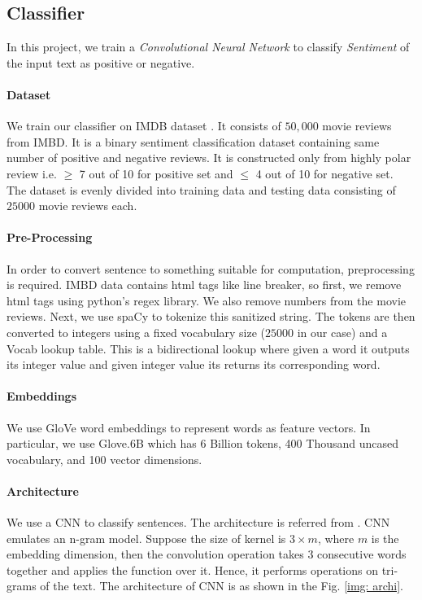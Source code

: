 \documentclass[12pt]{report}
\begin{document}
\begin{spacing}{1.5}
\section{Classifier}
In this project, we train a \textit{Convolutional Neural Network} to classify \textit{Sentiment} of the input text as positive or negative.
 \paragraph{Dataset}
We train our classifier on IMDB dataset \cite{imdb}. It consists of $50,000$ movie reviews from IMBD. It is a binary sentiment classification dataset containing same number of positive and negative reviews. It is constructed only from highly polar review i.e. $\geq$ 7 out of 10 for positive set and $\leq$ 4 out of 10 for negative set. The dataset is evenly divided into training data and testing data consisting of $25000$ movie reviews each.

\paragraph{Pre-Processing}
In order to convert sentence to something suitable for computation, preprocessing is required.
IMBD data contains html tags like line breaker, so first, we remove html tags using python's regex library. We also remove numbers from the movie reviews.
Next, we use spaCy \cite{spacy} to tokenize this sanitized string.
The tokens are then converted to integers using a fixed vocabulary size ($25000$ in our case) and a Vocab lookup table. This is a bidirectional lookup where given a word it outputs its integer value and given integer value its returns its corresponding word.
 
\paragraph{Embeddings}
We use GloVe \cite{glove} word embeddings to represent words as feature vectors.
In particular, we use Glove.6B which has 6 Billion tokens, 400 Thousand uncased vocabulary, and 100 vector dimensions.

\paragraph{Architecture}
We use a CNN to classify sentences. The architecture is referred from \cite{kim2014}.
CNN emulates an n-gram model. Suppose the size of kernel is $3 \times m$, where $m$ is the embedding dimension, then the convolution operation takes $3$ consecutive words together and applies the function over it. Hence, it performs operations on tri-grams of the text.
The architecture of CNN is as shown in the Fig. \ref{img: archi}.


\end{spacing}
\end{document}
